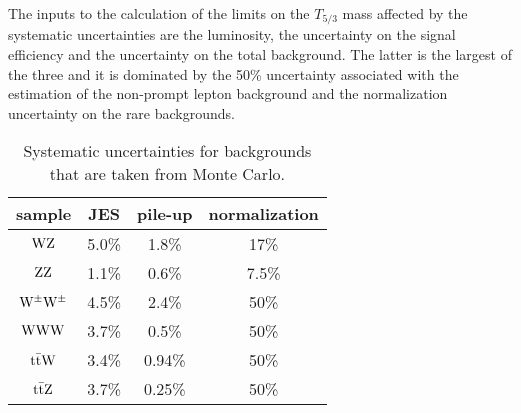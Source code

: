 The inputs to the calculation of the limits on the $T_{5/3}$ mass affected by the systematic uncertainties are the luminosity, the uncertainty on the signal efficiency 
and the uncertainty on the total background. The latter is the largest of the three and it is dominated by the 50\% uncertainty associated with the estimation of the 
non-prompt lepton background and the normalization uncertainty on the rare backgrounds.

\begin{table}[htb]
    \centering
\begin{tabular}{*4c}
    \toprule
    sample       &    JES & pile-up & normalization \\
    \midrule
$\mathrm{W}\mathrm{Z}$             & 5.0\%  & 1.8\%  & 17\%    \\
$\mathrm{Z}\mathrm{Z}$             & 1.1\%  & 0.6\%  & 7.5\% \\
$\mathrm{W}^{\pm}\mathrm{W}^{\pm}$ & 4.5\%  & 2.4\%  & 50\% \\
$\mathrm{W}\mathrm{W}\mathrm{W}$            & 3.7\%  & 0.5\%  & 50\% \\
$\mathrm{t}\bar{\mathrm{t}} \mathrm{W}$       & 3.4\%  & 0.94\% & 50\% \\
$\mathrm{t}\bar{\mathrm{t}} \mathrm{Z}$       & 3.7\%  & 0.25\% & 50\% \\
\bottomrule
\end{tabular}
\caption{Systematic uncertainties for backgrounds that are taken from Monte Carlo.}
\label{tab:MConlySystematics}
\end{table}

